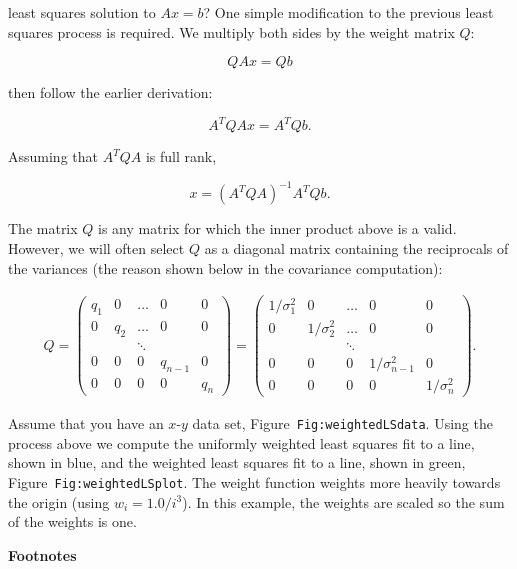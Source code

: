 least squares solution to \(A x = b\)? One simple modification to the
previous least squares process is required. We multiply both sides by
the weight matrix \(Q\):

\[QAx= Qb\]

then follow the earlier derivation:

\[A^T QAx = A^T Qb .\]

Assuming that \(A^T Q A\) is full rank,

\[x = \left(A^T Q A\right)^{-1} A^TQb .\]

The matrix \(Q\) is any matrix for which the inner product above is a
valid. However, we will often select \(Q\) as a diagonal matrix
containing the reciprocals of the variances (the reason shown below in
the covariance computation):

\[\begin{aligned}
Q =
\begin{pmatrix} q_1 & 0 & \dots & 0 & 0   \\
0 & q_2 & \dots & 0 & 0   \\
&& \ddots  &&\\
0 & 0 & 0 & q_{n-1} & 0   \\
0 & 0 & 0 & 0 & q_n
\end{pmatrix}
=
\begin{pmatrix} 1/\sigma_1^2 & 0 & \dots & 0 & 0   \\
0 & 1/\sigma_2^2 & \dots & 0 & 0   \\
&& \ddots  &&\\
0 & 0 & 0 & 1/\sigma_{n-1}^2 & 0   \\
0 & 0 & 0 & 0 & 1/\sigma_n^2
\end{pmatrix} .
\end{aligned}\]

Assume that you have an \(x\)-\(y\) data set,
Figure~\texttt{Fig:weightedLSdata}. Using the process above we compute
the uniformly weighted least squares fit to a line, shown in blue, and
the weighted least squares fit to a line, shown in green,
Figure~\texttt{Fig:weightedLSplot}. The weight function weights more
heavily towards the origin (using \(w_i = 1.0/i^3\)). In this example,
the weights are scaled so the sum of the weights is one.

\textbf{Footnotes}
